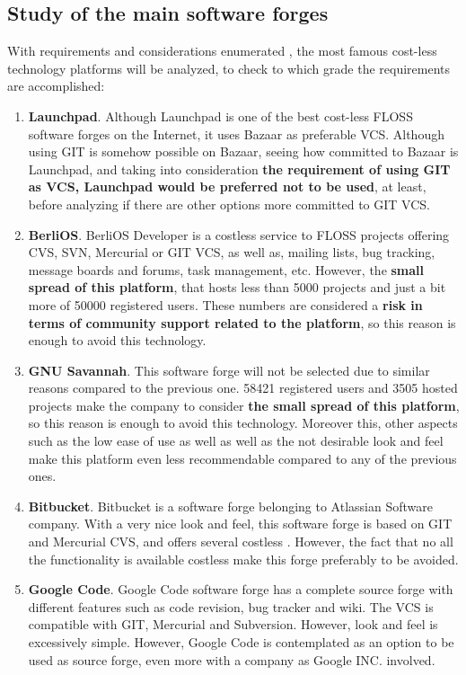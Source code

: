 \documentclass[11pt]{article}
\begin{document}
\subsection{Study of the main software forges}
With requirements and considerations enumerated , the most famous cost-less technology platforms will be analyzed, to check to which grade the requirements are accomplished:
\begin{enumerate}\itemsep0pt
\item{\textbf{Launchpad}}. Although Launchpad is one of the best cost-less FLOSS software forges on the Internet, it uses Bazaar as preferable VCS. Although using GIT is somehow possible on Bazaar, seeing how committed to Bazaar is Launchpad, and taking into consideration \textbf{the requirement of using GIT as VCS, Launchpad would be preferred not to be used}, at least, before analyzing if there are other options more committed to GIT VCS.
\item{\textbf{BerliOS}}. BerliOS Developer is a costless service to FLOSS projects offering CVS, SVN, Mercurial or GIT VCS, as well as, mailing lists, bug tracking, message boards and forums, task management, etc. However, the \textbf{small spread of this platform}, that hosts less than 5000 projects and just a bit more of 50000 registered users. These numbers are considered a \textbf{risk in terms of community support related to the platform}, so this reason is enough to avoid this technology.
\item{\textbf{GNU Savannah}}. This software forge will not be selected due to similar reasons compared to the previous one. 58421 registered users and 3505 hosted projects make the company to consider \textbf{the small spread of this platform}, so this reason is enough to avoid this technology. Moreover this, other aspects such as the low ease of use as well as well as the not desirable look and feel make this platform even less recommendable compared to any of the previous ones.
\item{\textbf{Bitbucket}}. Bitbucket is a software forge belonging to Atlassian Software company. With a very nice look and feel, this software forge is based on GIT and Mercurial CVS, and offers several costless . However, the fact that no all the functionality is available costless make this forge preferably to be avoided.
\item{\textbf{Google Code}}. Google Code software forge has a complete source forge with different features such as code revision, bug tracker and wiki. The VCS is compatible with GIT, Mercurial and Subversion. However, look and feel is excessively simple. However, Google Code is contemplated as an option to be used as source forge, even more with a company as Google INC. involved. 

\end{enumerate}
\end{document}
